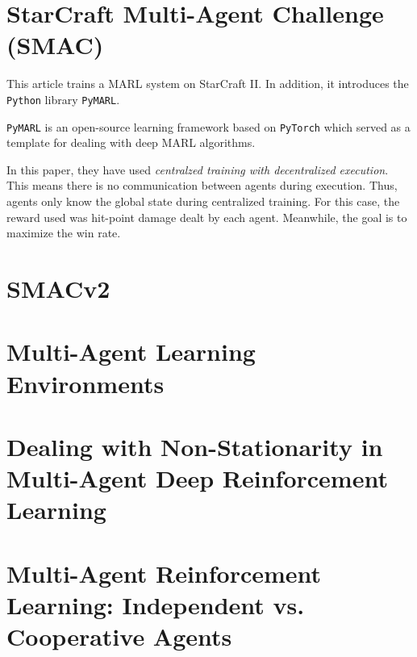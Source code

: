 \documentclass{article}
\begin{document}
\section*{StarCraft Multi-Agent Challenge (SMAC)}        \label{sec.smac}
This  article trains a MARL system on StarCraft II. In addition, it introduces the \texttt{Python} library
\texttt{PyMARL}.

\texttt{PyMARL} is an open-source learning framework based on
\texttt{PyTorch} which served as a template for dealing with deep MARL algorithms.

In this paper, they have used \textit{centralzed training with decentralized execution}. This means there
is no communication between agents during execution. Thus, agents only know the global state during
centralized training. For this case, the reward used was hit-point damage dealt by each agent. Meanwhile,
the goal is to maximize the win rate.




\section*{SMACv2}               \label{sec.smacv2}


\section*{Multi-Agent Learning Environments}      \label{sec.male}

\section*{Dealing with Non-Stationarity in Multi-Agent Deep Reinforcement Learning}  \label{sec.non_stat_marl}

\section*{Multi-Agent Reinforcement Learning: Independent vs. Cooperative Agents}   \label{sec.ind_vs_coop}
\end{document}
